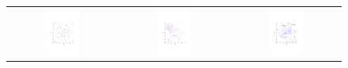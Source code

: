 \documentclass{article} %
\begin{document}
\begin{figure}[t!]
\setlength{\tabcolsep}{0em}
\vspace{-1mm}
\begin{center}
\begin{tabular}{ccc}
\includegraphics[trim={3.2cm 6cm 3.2cm 9cm},clip,width=0.33\textwidth]{../plots3/dist_contour.pdf}
& \includegraphics[trim={3.2cm 6cm 3.2cm 9cm},clip,width=0.33\textwidth]{../plots3/BaselineHMC_l25_eps0_1_log_scatter2D.pdf} 
&\includegraphics[trim={3.2cm 6cm 3cm 9cm},clip,width=0.33\textwidth]{../plots3/ReflectiveHMC_l25_eps0_1_log_scatter2D_annotated.pdf}  \\

\end{tabular}
\end{center}
\end{figure}
\end{document}
